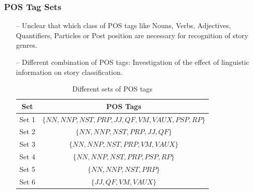 \documentclass{beamer}
\begin{document}

\begin{frame} \label{POS Tag Sets}
\frametitle{POS Tag Sets}
\begin{itemize}
\item[--] Unclear that which class of POS tags like Nouns, Verbs, Adjectives, Quantifiers, Particles or Post position are necessary for recognition of story genres.

\item[--] Different combination of POS tags: Investigation of the effect of linguistic
information on story classification.

\begin{table}[h]
\renewcommand{\arraystretch}{1}
\caption {Different sets of POS tags \hyperlink{POS Definition}{\beamerreturnbutton{}}\label{Table: POS Sets}} 
\centering
\begin{tabular}{|c|c|}
\hline
Set & POS Tags\\
\hline
Set 1 & $\lbrace NN, NNP, NST, PRP, JJ, QF, VM, VAUX, PSP, RP \rbrace$ \\ \hline
Set 2 & $\lbrace NN, NNP, NST, PRP, JJ, QF \rbrace$\\ \hline
Set 3 & $\lbrace NN, NNP, NST, PRP, VM, VAUX \rbrace$ \\ \hline
Set 4 & $\lbrace NN, NNP, NST, PRP, PSP, RP \rbrace$\\ \hline
Set 5 & $\lbrace NN, NNP, NST, PRP \rbrace$\\ \hline
Set 6 & $\lbrace JJ, QF, VM, VAUX \rbrace$\\
 \hline
\end{tabular}
\end{table}
\end{itemize}
\end{frame}
\end{document}
